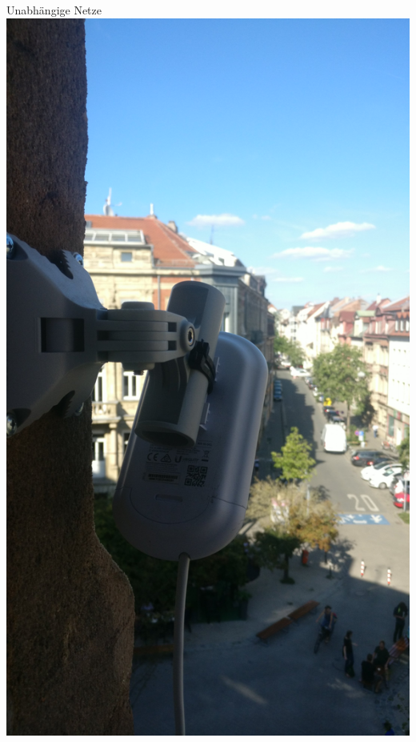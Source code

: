 \documentclass{beamer}
\begin{document}
	\begin{frame}[standout]{Unabhängige Netze}
		\includegraphics[height=\textheight]{media/ap-unabhaengig.jpg}
	\end{frame}
\end{document}
